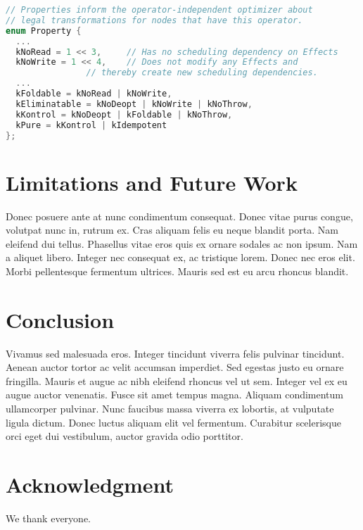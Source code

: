 \documentclass[11pt,conference]{IEEEtran}
\begin{document}
\begin{lstlisting}[caption={operator.h; line 40-54},captionpos=b,language=C++]
// Properties inform the operator-independent optimizer about 
// legal transformations for nodes that have this operator.
enum Property {
  ...
  kNoRead = 1 << 3,     // Has no scheduling dependency on Effects
  kNoWrite = 1 << 4,    // Does not modify any Effects and 
                // thereby create new scheduling dependencies.
  ...
  kFoldable = kNoRead | kNoWrite,
  kEliminatable = kNoDeopt | kNoWrite | kNoThrow,
  kKontrol = kNoDeopt | kFoldable | kNoThrow,
  kPure = kKontrol | kIdempotent
};
\end{lstlisting}

\section{Limitations and Future Work} \label{limitations}

Donec posuere ante at nunc condimentum consequat. Donec vitae purus congue, volutpat nunc in, rutrum ex. Cras aliquam felis eu neque blandit porta. Nam eleifend dui tellus. Phasellus vitae eros quis ex ornare sodales ac non ipsum. Nam a aliquet libero. Integer nec consequat ex, ac tristique lorem. Donec nec eros elit. Morbi pellentesque fermentum ultrices. Mauris sed est eu arcu rhoncus blandit. 

\section{Conclusion} \label{conclusion}

Vivamus sed malesuada eros. Integer tincidunt viverra felis pulvinar tincidunt. Aenean auctor tortor ac velit accumsan imperdiet. Sed egestas justo eu ornare fringilla. Mauris et augue ac nibh eleifend rhoncus vel ut sem. Integer vel ex eu augue auctor venenatis. Fusce sit amet tempus magna. Aliquam condimentum ullamcorper pulvinar. Nunc faucibus massa viverra ex lobortis, at vulputate ligula dictum. Donec luctus aliquam elit vel fermentum. Curabitur scelerisque orci eget dui vestibulum, auctor gravida odio porttitor. 

\section*{Acknowledgment}

We thank everyone.



\end{document}
